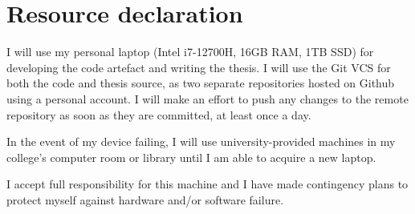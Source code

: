 \documentclass[a4paper,12pt]{article}
\begin{document}
\section{Resource declaration}
I will use my personal laptop (Intel i7-12700H, 16GB RAM, 1TB SSD) for developing the
code artefact and writing the thesis. I will use the Git VCS for both the code and thesis
source, as two separate repositories hosted on Github using a personal account.
I will make an effort to push any changes to the remote repository as soon as they are
committed, at least once a day.

In the event of my device failing, I will use university-provided machines in my college's
computer room or library until I am able to acquire a new laptop.

I accept full responsibility for this machine and I have made contingency plans to protect
myself against hardware and/or software failure.

{}

\end{document}
